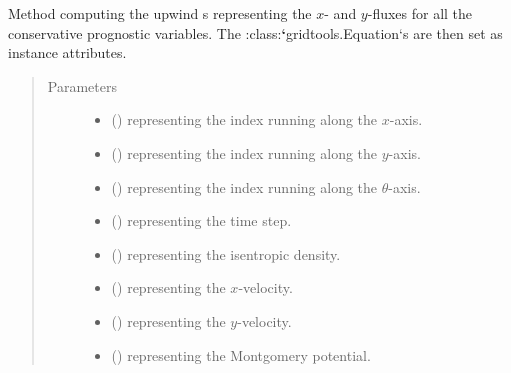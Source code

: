 \documentclass[letterpaper,10pt,english]{sphinxmanual}
\begin{document}
\begin{fulllineitems}
\begin{fulllineitems}
\label{\detokenize{api:dycore.flux_isentropic.FluxIsentropicUpwind._compute_fluxes}}
Method computing the upwind s representing the \(x\)- and \(y\)-fluxes for all
the conservative prognostic variables. The :class:{\color{red}\bfseries{}{}`}gridtools.Equation{}`s are then set as instance attributes.
\begin{quote}\begin{description}
\item[{Parameters}] \leavevmode\begin{itemize}
\item {} 
 () \textendash{}  representing the index running along the \(x\)-axis.

\item {} 
 () \textendash{}  representing the index running along the \(y\)-axis.

\item {} 
 () \textendash{}  representing the index running along the \(\theta\)-axis.

\item {} 
 () \textendash{}  representing the time step.

\item {} 
 () \textendash{}  representing the isentropic density.

\item {} 
 () \textendash{}  representing the \(x\)-velocity.

\item {} 
 () \textendash{}  representing the \(y\)-velocity.

\item {} 
 () \textendash{}  representing the Montgomery potential.


\end{itemize}
\end{description}
\end{quote}
\end{fulllineitems}
\end{fulllineitems}
\end{document}

